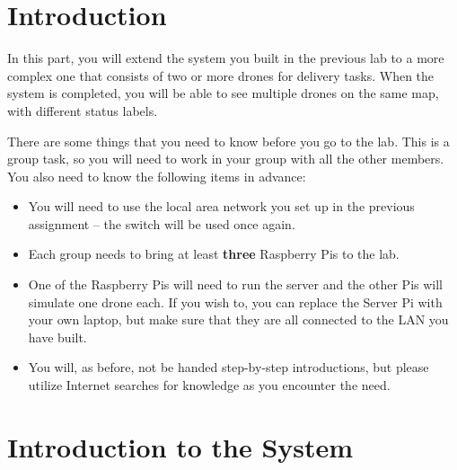\documentclass{article}
\begin{document}
\section{Introduction}
In this part, you will extend the system you built in the previous lab to a more complex one that consists of two or more drones for delivery tasks. When the system is completed, you will be able to see multiple drones on the same map, with different status labels.

There are some things that you need to know before you go to the lab. This is a group task, so you will need to work in your group with all the other members. You also need to know the following items in advance:
\begin{itemize}
    \item  You will need to use the local area network you set up in the previous assignment -- the switch will be used once again.
    \item Each group needs to bring at least {\bf three} Raspberry Pis to the lab.
    \item One of the Raspberry Pis will need to run the server and the other Pis will simulate one drone each. If you wish to, you can replace the Server Pi with your own laptop, but make sure that they are all connected to the LAN you have built.
    \item You will, as before, not be handed step-by-step introductions, but please utilize Internet searches for knowledge as you encounter the need.
\end{itemize}

\section{Introduction to the System}
\end{document}

